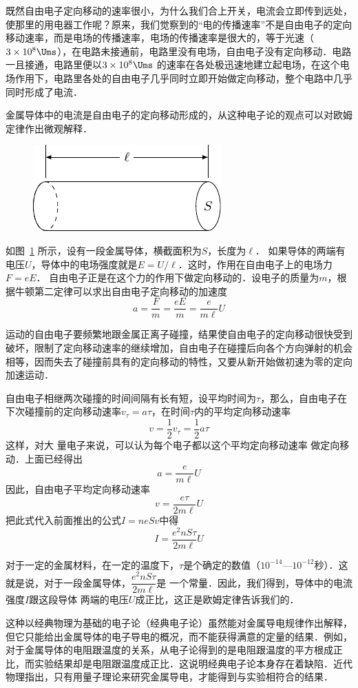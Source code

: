 既然自由电子定向移动的速率很小，为什么我们合上开关，电流会立即传到远处，使那里的用电器工作呢？原来，我们觉察到的“电的传播速率”不是自由电子的定向移动速率，而是电场的传播速率，电场的传播速率是很大的，等于光速（$3\times10^8\Ums$），在电路未接通前，电路里没有电场，自由电子没有定向移动．电路一且接通，电路里便以$3\times10^8\Ums$
的速率在各处极迅速地建立起电场，在这个电场作用下，电路里各处的自由电子几乎同时立即开始做定向移动，整个电路中几乎同时形成了电流．

金属导体中的电流是自由电子的定向移动形成的，从这种电子论的观点可以对欧姆定律作出微观解释．
\begin{figure}[htbp]
    \centering
    \includegraphics{fig/B/8-2.pdf}
    \caption{}\label{fig_B_8-2}
\end{figure}

如图~\ref{fig_B_8-2} 所示，设有一段金属导体，横截面积为$S$，长度为$\ell$． 如果导体的两端有电压$U$，导体中的电场强度就是$E=U/\ell$．这时，作用在自由电子上的电场力$F=eE$． 自由电子正是在这个力的作用下做定向移动的．设电子的质量为$m$，根
据牛顿第二定律可以求出自由电子定向移动的加速度
\[a=\frac{F}{m}=\frac{eE}{m}=\frac{e}{m\ell}U\]

运动的自由电子要频繁地跟金属正离子碰撞，结果使自由电子的定向移动很快受到破坏，限制了定向移动速率的继续增加，自由电子在碰撞后向各个方向弹射的机会相等，因而失去了碰撞前具有的定向移动的特性，又要从新开始做初速为零的定向加速运动．

自由电子相继两次碰撞的时间间隔有长有短，设平均时间为$\tau$，那么，自由电子在下次碰撞前的定向移动速率$v_{\tau}=a\tau$，在时间$\tau$内的平均定向移动速率
\[v=\frac{1}{2}v_{\tau}=\frac{1}{2}a\tau\]
这样，对大
量电子来说，可以认为每个电子都以这个平均定向移动速率
做定向移动．上面已经得出
\[a=\frac{e}{m\ell}U\]
因此，自由电子平均定向移动速率
\[v=\frac{e\tau}{2m\ell}U\]
把此式代入前面推出的公式$I=neSv$中得
\[I=\frac{e^2 nS\tau}{2m\ell}U\]

对于一定的金属材料，在一定的温度下，$\tau$是个确定的数值（$10^{-14}$—$10^{-12}$秒）．这就是说，对于一段金属导体，$\dfrac{e^2 nS\tau}{2m\ell}$是
一个常量．因此，我们得到，导体中的电流强度$I$跟这段导体
两端的电压$U$成正比，这正是欧姆定律告诉我们的．

这种以经典物理为基础的电子论（经典电子论）虽然能对金属导电规律作出解释，但它只能给出金属导体的电子导电的概况，而不能获得满意的定量的结果．例如，对于金属导体的电阻跟温度的关系，从电子论得到的是电阻跟温度的平方根成正比，而实验结果却是电阻跟温度成正比．这说明经典电子论本身存在着缺陷．近代物理指出，只有用量子理论来研究金属导电，才能得到与实验相符合的结果．

